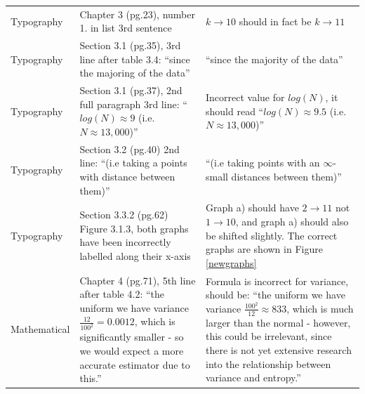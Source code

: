 \documentclass[11pt]{report}
\begin{document}
\begin{longtable}{| p{23mm} | p{52mm}| p{70mm}|}
Typography & Chapter 3 (pg.23), number 1. in list 3rd sentence & $k \to 10$ should in fact be $k \to 11$ \\
Typography & Section 3.1 (pg.35), 3rd line after table 3.4: \newline ``since the majoring of the data'' & ``since the majority of the data'' \\
Typography & Section 3.1 (pg.37), 2nd full paragraph 3rd line: \newline ``$log(N) \approx 9$ (i.e. $N \approx 13,000$)'' & Incorrect value for $log(N)$, it should read \newline ``$log(N) \approx 9.5$ (i.e. $N \approx 13,000$)'' \\
Typography & Section 3.2 (pg.40) 2nd line: \newline ``(i.e taking a points with distance between them)'' & ``(i.e taking points with an $\infty$-small distances between them)''\\
Typography & Section 3.3.2 (pg.62) Figure 3.1.3, both graphs have been incorrectly labelled along their x-axis & Graph a) should have $2 \to 11$ not $1 \to 10$, and graph a) should also be shifted slightly. The correct graphs are shown in Figure \ref{newgraphs}\\
Mathematical & Chapter 4 (pg.71), 5th line after table 4.2: \newline ``the uniform we have variance $\frac{12}{100^2} = 0.0012$, which is significantly smaller - so we would expect a more accurate estimator due to this.'' & Formula is incorrect for variance, should be: \newline ``the uniform we have variance $\frac{100^2}{12} \approx 833$, which is much larger than the normal - however, this could be irrelevant, since there is not yet extensive research into the relationship between variance and entropy.'' \\
\hline
\end{longtable}    
\end{document}
